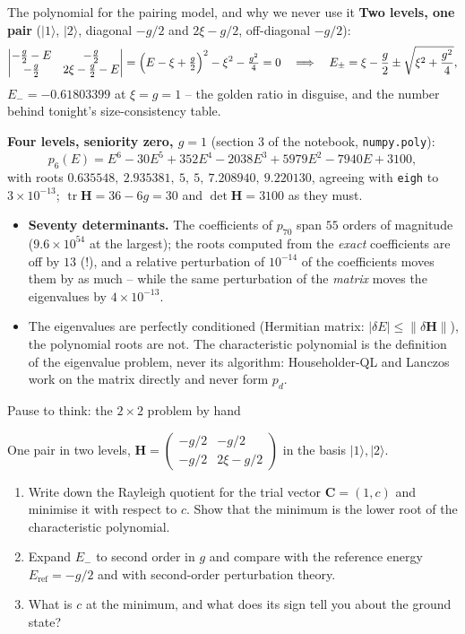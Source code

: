 \documentclass[aspectratio=169,10pt]{beamer}
\newcounter{thinkctr}
\newcommand{\thinkq}[2]{%
  \stepcounter{thinkctr}%
  \begin{tcolorbox}[colback=palewarm,colframe=warm,title={\bfseries Pause to think \#\thethinkctr\hfill\mdseries\small(about #1 min -- discuss with your neighbour)},fonttitle=\bfseries]
  #2
  \end{tcolorbox}}
\newcommand{\ket}[1]{\vert #1\rangle}
\DeclareMathOperator{\tr}{tr}
\begin{document}
\begin{frame}{The polynomial for the pairing model, and why we never use it}
  \footnotesize
  \textbf{Two levels, one pair} ($\ket{1}$, $\ket{2}$, diagonal $-g/2$ and $2\xi-g/2$, off-diagonal $-g/2$):
  \[
    \begin{vmatrix} -\tfrac g2-E & -\tfrac g2\\ -\tfrac g2 & 2\xi-\tfrac g2-E\end{vmatrix}
    =\Bigl(E-\xi+\tfrac g2\Bigr)^2-\xi^2-\tfrac{g^2}{4}=0
    \quad\Longrightarrow\quad
    E_{\pm}=\xi-\frac g2\pm\sqrt{\xi^2+\frac{g^2}{4}},
  \]
  $E_-=-0.61803399$ at $\xi=g=1$ -- the golden ratio in disguise, and the number behind tonight's size-consistency table.
  \vspace{0.2em}

  \textbf{Four levels, seniority zero, $g=1$} (section 3 of the notebook, \texttt{numpy.poly}):
  \[
    p_6(E)=E^6-30E^5+352E^4-2038E^3+5979E^2-7940E+3100,
  \]
  with roots $0.635548,\ 2.935381,\ 5,\ 5,\ 7.208940,\ 9.220130$, agreeing with \texttt{eigh} to $3\times10^{-13}$; $\tr\bm{H}=36-6g=30$ and $\det\bm{H}=3100$ as they must.
  \begin{itemize}
    \item \textbf{Seventy determinants.} The coefficients of $p_{70}$ span $55$ orders of magnitude ($9.6\times10^{54}$ at the largest); the roots computed from the \emph{exact} coefficients are off by $13$ (!), and a relative perturbation of $10^{-14}$ of the coefficients moves them by as much -- while the same perturbation of the \emph{matrix} moves the eigenvalues by $4\times10^{-13}$.
    \item The eigenvalues are perfectly conditioned (Hermitian matrix: $|\delta E|\le\|\delta\bm{H}\|$), the polynomial roots are not. The characteristic polynomial is the \alert{definition} of the eigenvalue problem, never its \alert{algorithm}: Householder-QL and Lanczos work on the matrix directly and never form $p_d$.
  \end{itemize}
\end{frame}

\begin{frame}{Pause to think: the $2\times2$ problem by hand}
  \thinkq{4}{One pair in two levels, $\bm{H}=\begin{pmatrix}-g/2 & -g/2\\ -g/2 & 2\xi-g/2\end{pmatrix}$ in the basis $\ket{1},\ket{2}$.
  \begin{enumerate}
    \item Write down the Rayleigh quotient for the trial vector $\bm{C}=(1,c)$ and minimise it with respect to $c$. Show that the minimum is the lower root of the characteristic polynomial.
    \item Expand $E_-$ to second order in $g$ and compare with the reference energy $E_{\mathrm{ref}}=-g/2$ and with second-order perturbation theory.
    \item What is $c$ at the minimum, and what does its sign tell you about the ground state?
  \end{enumerate}}
\end{frame}
\end{document}
